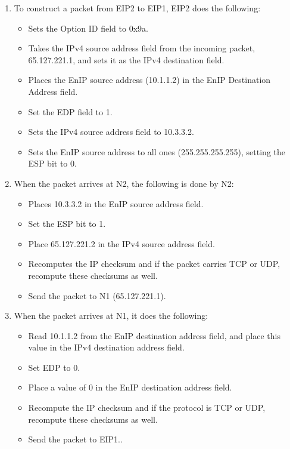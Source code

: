 \begin{enumerate}
\item To construct a packet from EIP2 to EIP1, EIP2 does the following:
  \begin{itemize}
   \item  Sets the Option ID field to 0x9a.
   \item Takes the IPv4 source address field from the incoming packet, 65.127.221.1,
   and sets it as the IPv4 destination field.
   \item  Places the EnIP source address (10.1.1.2) in the EnIP Destination Address field.
   \item Set the EDP field to 1.
   \item  Sets the IPv4 source address field to 10.3.3.2.
   \item  Sets the EnIP source address to all ones (255.255.255.255), setting the ESP bit to 0.
  \end{itemize}

\item When the packet arrives at N2, the following is done by N2:
  \begin{itemize}
   \item Places 10.3.3.2 in the EnIP source address field.
   \item Set the ESP bit to 1.
   \item Place 65.127.221.2 in the IPv4 source address field.
   \item Recomputes the IP checksum and if the packet carries TCP or UDP, recompute these checksums as well.
   \item Send the packet to N1 (65.127.221.1).
  \end{itemize}

\item When the packet arrives at N1, it does the following:
  \begin{itemize}
   \item  Read 10.1.1.2 from the EnIP destination address field, and place this value in the IPv4 destination address field.
   \item  Set EDP to 0.
   \item Place a value of 0 in the EnIP destination address field.
   \item Recompute the IP checksum and if the protocol is TCP or UDP, recompute these checksums as well.
   \item Send the packet to EIP1..
  \end{itemize}

\end{enumerate}

